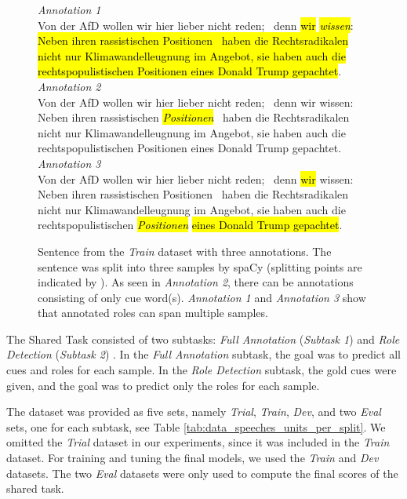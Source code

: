 \documentclass[11pt,a4paper]{article}
\newcommand{\cue}[1]{\sethlcolor{cue}\hl{\emph{#1}}}
\newcommand{\source}[1]{\sethlcolor{source}\hl{#1}}
\newcommand{\msg}[1]{\sethlcolor{message}\hl{#1}}
\begin{document}
\begin{figure}[t]
    \centering
    \begin{mdframed}[
            leftmargin=0pt,
            rightmargin=0pt,
            skipabove=0pt,
            skipbelow=0pt,
        ]
        \small
        \emph{Annotation 1}
        \\
        Von der AfD wollen wir hier lieber nicht reden; \ddag\, denn \source{wir} \cue{wissen}: \msg{Neben ihren rassistischen Positionen \ddag\, haben die Rechtsradikalen nicht nur Klimawandelleugnung im Angebot, sie haben auch die rechtspopulistischen Positionen eines Donald Trump gepachtet}.
        \\

        \emph{Annotation 2}
        \\
        Von der AfD wollen wir hier lieber nicht reden; \ddag\, denn wir wissen: Neben ihren rassistischen \cue{Positionen} \ddag\, haben die Rechtsradikalen nicht nur Klimawandelleugnung im Angebot, sie haben auch die rechtspopulistischen Positionen eines Donald Trump gepachtet.
        \\

        \emph{Annotation 3}
        \\
        Von der AfD wollen wir hier lieber nicht reden; \ddag\, denn \source{wir} wissen: Neben ihren rassistischen Positionen \ddag\, haben die Rechtsradikalen nicht nur Klimawandelleugnung im Angebot, sie haben auch die rechtspopulistischen \cue{Positionen} \msg{eines Donald Trump gepachtet}.
    \end{mdframed}
    \caption{
        Sentence from the \emph{Train} dataset with three annotations.
        The sentence was split into three samples by spaCy (splitting points are indicated by \ddag).
        As seen in \emph{Annotation 2}, there can be annotations consisting of only cue word(s).
        \emph{Annotation 1} and \emph{Annotation 3} show that annotated roles can span multiple samples.
    }
    \label{fig:example_annotation}
\end{figure}

The Shared Task consisted of two subtasks: \emph{Full Annotation} (\emph{Subtask 1}) and \emph{Role Detection} (\emph{Subtask 2}) \cite{GermEval2023}.
In the \emph{Full Annotation} subtask, the goal was to predict all cues and roles for each sample.
In the \emph{Role Detection} subtask, the gold cues were given, and the goal was to predict only the roles for each sample.

The dataset was provided as five sets, namely \emph{Trial}, \emph{Train}, \emph{Dev}, and two \emph{Eval} sets, one for each subtask, see Table \ref{tab:data_speeches_units_per_split}.
We omitted the \emph{Trial} dataset in our experiments, since it was included in the \emph{Train} dataset.
For training and tuning the final models, we used the \emph{Train} and \emph{Dev} datasets.
The two \emph{Eval} datasets were only used to compute the final scores of the shared task.
\end{document}
